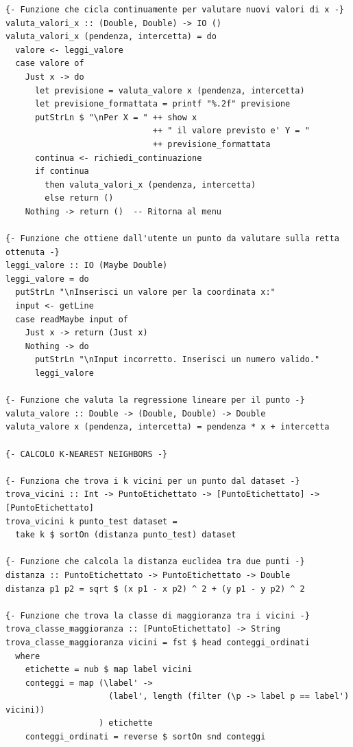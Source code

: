 \documentclass[11pt]{article}
\theoremstyle{definition}
\begin{document}
\begin{verbatim}
{- Funzione che cicla continuamente per valutare nuovi valori di x -}
valuta_valori_x :: (Double, Double) -> IO ()
valuta_valori_x (pendenza, intercetta) = do
  valore <- leggi_valore
  case valore of
    Just x -> do
      let previsione = valuta_valore x (pendenza, intercetta)
      let previsione_formattata = printf "%.2f" previsione
      putStrLn $ "\nPer X = " ++ show x 
                              ++ " il valore previsto e' Y = " 
                              ++ previsione_formattata
      continua <- richiedi_continuazione
      if continua
        then valuta_valori_x (pendenza, intercetta)
        else return ()
    Nothing -> return ()  -- Ritorna al menu

{- Funzione che ottiene dall'utente un punto da valutare sulla retta ottenuta -}
leggi_valore :: IO (Maybe Double)
leggi_valore = do
  putStrLn "\nInserisci un valore per la coordinata x:"
  input <- getLine
  case readMaybe input of
    Just x -> return (Just x)
    Nothing -> do
      putStrLn "\nInput incorretto. Inserisci un numero valido."
      leggi_valore

{- Funzione che valuta la regressione lineare per il punto -}
valuta_valore :: Double -> (Double, Double) -> Double
valuta_valore x (pendenza, intercetta) = pendenza * x + intercetta

{- CALCOLO K-NEAREST NEIGHBORS -}

{- Funziona che trova i k vicini per un punto dal dataset -}
trova_vicini :: Int -> PuntoEtichettato -> [PuntoEtichettato] -> [PuntoEtichettato]
trova_vicini k punto_test dataset =
  take k $ sortOn (distanza punto_test) dataset

{- Funzione che calcola la distanza euclidea tra due punti -}
distanza :: PuntoEtichettato -> PuntoEtichettato -> Double
distanza p1 p2 = sqrt $ (x p1 - x p2) ^ 2 + (y p1 - y p2) ^ 2

{- Funzione che trova la classe di maggioranza tra i vicini -}
trova_classe_maggioranza :: [PuntoEtichettato] -> String
trova_classe_maggioranza vicini = fst $ head conteggi_ordinati
  where
    etichette = nub $ map label vicini
    conteggi = map (\label' -> 
                     (label', length (filter (\p -> label p == label') vicini))
                   ) etichette
    conteggi_ordinati = reverse $ sortOn snd conteggi


\end{verbatim}
\end{document}
